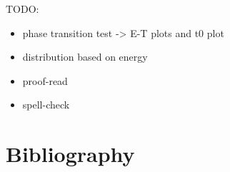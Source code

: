\newpage
TODO:
\begin{itemize}
\item phase transition test -> E-T plots and t0 plot
\item distribution based on energy
\item proof-read
\item spell-check
\end{itemize}


\newpage
\section*{Bibliography}
\printbibliography[heading=none, keyword={secondary}]


